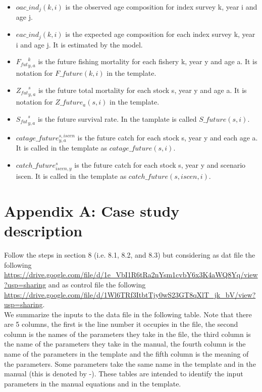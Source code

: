 \documentclass{article}
\begin{document}
\begin{itemize}
    \item $oac\_ind_j(k,i)$ is the observed age composition for index survey k, year i and age j.
    \item $eac\_ind_j(k,i)$ is the expected age composition for each index survey k, year i and age j. It is estimated by the model.
    \item ${F_{fut}}^{k}_{y,a}$  is the future  fishing mortality  for each fishery k, year y and age a. It is notation for $F\_future(k,i)$ in the template.
    \item ${Z_{fut}}^s_{y,a}$ is the future total mortality for each stock s, year y and age a. It is notation for $Z\_future_a(s,i)$ in the template.
    \item ${S_{fut}}^s_{y,a}$ is the future survival rate. In the tamplate is called $S\_future(s,i)$.
    \item $catage\_future^{s,iscen}_{y,a}$ is the future catch for each stock s, year y and each age a. It is called in the template as 
 $catage\_future(s,i)$.
    \item $catch\_future^s_{iscen,y}$ is the future catch for each stock s, year y and scenario iscen. It is called in the template as $catch\_future(s,iscen,i)$.
    
    


\end{itemize}


\section{Appendix A: Case study description}
\label{section:AppendixA}
Follow the steps in section 8 (i.e. 8.1, 8.2, and 8.3) but considering as dat file the following \url{https://drive.google.com/file/d/1e_VbI1R6tRa2nYsm1cvbY6x3K4aWQ8Yq/view?usp=sharing} and as control file the following \url{https://drive.google.com/file/d/1Wl6TRf3ItbtTjy0wS23GT8qXlT_jk_bV/view?usp=sharing}.\\

We summarize the inputs to the data file in the following table. Note that there are 5 columns, the first is the line number it occupies in the file, the second column is the names of the parameters they take in the file, the third column is the name of the parameters they take in the manual, the fourth column is the name of the parameters in the template and the fifth column is the meaning of the parameters. Some parameters take the same name in the template and in the manual (this is denoted by -). These tables are intended to identify the input parameters in the manual equations and in the template.
\end{document}
